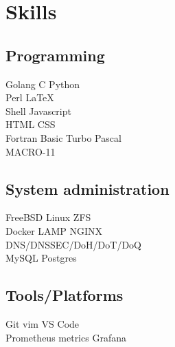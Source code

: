 \documentclass[]{schorscv}
\begin{document}
\begin{minipage}[t]{0.25\textwidth} 


\section{Skills}
\subsection{Programming}
\sectionsep
{}
Golang \textbullet{} C \textbullet{} Python \\
\sectionsep
{}
Perl \textbullet{} \LaTeX\  \\
\sectionsep
{}
Shell \textbullet{}  Javascript \\ HTML \textbullet{} CSS \\
\sectionsep
{}
Fortran \textbullet{} Basic \textbullet{} Turbo Pascal \\ MACRO-11 \\
\sectionsep
\sectionsep
\subsection{System administration}
\sectionsep
FreeBSD \textbullet{} Linux \textbullet{} ZFS \\ 
Docker  \textbullet{} LAMP \textbullet{} NGINX \\
DNS/DNSSEC/DoH/DoT/DoQ \\
MySQL  \textbullet{} Postgres \\
\sectionsep
\sectionsep
\subsection{Tools/Platforms}
\sectionsep
Git \textbullet{} vim \textbullet{} VS Code \\
Prometheus metrics \textbullet{} Grafana \\
\sectionsep
\sectionsep



\end{minipage}
\end{document}
